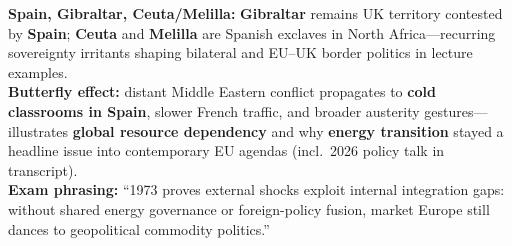 \documentclass[10pt,a4paper]{article}
\begin{document}
{\textbf{Spain, Gibraltar, Ceuta/Melilla:} \textbf{Gibraltar} remains UK territory contested by \textbf{Spain}; \textbf{Ceuta} and \textbf{Melilla} are Spanish exclaves in North Africa---recurring sovereignty irritants shaping bilateral and EU--UK border politics in lecture examples.\\
\textbf{Butterfly effect:} distant Middle Eastern conflict propagates to \textbf{cold classrooms in Spain}, slower French traffic, and broader austerity gestures---illustrates \textbf{global resource dependency} and why \textbf{energy transition} stayed a headline issue into contemporary EU agendas (incl.\ 2026 policy talk in transcript).\\
\textbf{Exam phrasing:} ``1973 proves external shocks exploit internal integration gaps: without shared energy governance or foreign-policy fusion, market Europe still dances to geopolitical commodity politics.''
}
\end{document}
